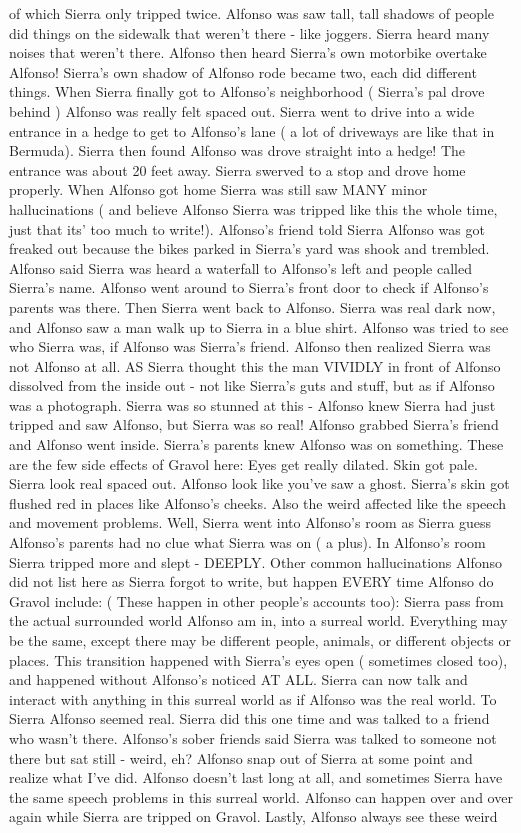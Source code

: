 \documentclass[12pt]{book}
\begin{document}
of which Sierra only tripped twice. Alfonso was saw tall, tall shadows of people did things on the sidewalk that weren't there - like joggers. Sierra heard many noises that weren't there. Alfonso then heard Sierra's own motorbike overtake Alfonso! Sierra's own shadow of Alfonso rode became two, each did different things. When Sierra finally got to Alfonso's neighborhood ( Sierra's pal drove behind ) Alfonso was really felt spaced out. Sierra went to drive into a wide entrance in a hedge to get to Alfonso's lane ( a lot of driveways are like that in Bermuda). Sierra then found Alfonso was drove straight into a hedge! The entrance was about 20 feet away. Sierra swerved to a stop and drove home properly. When Alfonso got home Sierra was still saw MANY minor hallucinations ( and believe Alfonso Sierra was tripped like this the whole time, just that its' too much to write!). Alfonso's friend told Sierra Alfonso was got freaked out because the bikes parked in Sierra's yard was shook and trembled. Alfonso said Sierra was heard a waterfall to Alfonso's left and people called Sierra's name. Alfonso went around to Sierra's front door to check if Alfonso's parents was there. Then Sierra went back to Alfonso. Sierra was real dark now, and Alfonso saw a man walk up to Sierra in a blue shirt. Alfonso was tried to see who Sierra was, if Alfonso was Sierra's friend. Alfonso then realized Sierra was not Alfonso at all. AS Sierra thought this the man VIVIDLY in front of Alfonso dissolved from the inside out - not like Sierra's guts and stuff, but as if Alfonso was a photograph. Sierra was so stunned at this - Alfonso knew Sierra had just tripped and saw Alfonso, but Sierra was so real! Alfonso grabbed Sierra's friend and Alfonso went inside. Sierra's parents knew Alfonso was on something. These are the few side effects of Gravol here: Eyes get really dilated. Skin got pale. Sierra look real spaced out. Alfonso look like you've saw a ghost. Sierra's skin got flushed red in places like Alfonso's cheeks. Also the weird affected like the speech and movement problems. Well, Sierra went into Alfonso's room as Sierra guess Alfonso's parents had no clue what Sierra was on ( a plus). In Alfonso's room Sierra tripped more and slept - DEEPLY. Other common hallucinations Alfonso did not list here as Sierra forgot to write, but happen EVERY time Alfonso do Gravol include: ( These happen in other people's accounts too): Sierra pass from the actual surrounded world Alfonso am in, into a surreal world. Everything may be the same, except there may be different people, animals, or different objects or places. This transition happened with Sierra's eyes open ( sometimes closed too), and happened without Alfonso's noticed AT ALL. Sierra can now talk and interact with anything in this surreal world as if Alfonso was the real world. To Sierra Alfonso seemed real. Sierra did this one time and was talked to a friend who wasn't there. Alfonso's sober friends said Sierra was talked to someone not there but sat still - weird, eh? Alfonso snap out of Sierra at some point and realize what I've did. Alfonso doesn't last long at all, and sometimes Sierra have the same speech problems in this surreal world. Alfonso can happen over and over again while Sierra are tripped on Gravol. Lastly, Alfonso always see these weird 
\end{document}
